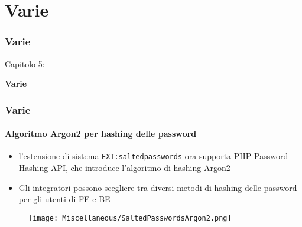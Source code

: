 %

\section{Varie}
\begin{frame}[fragile]
	\frametitle{Varie}

	\begin{center}\huge{Capitolo 5:}\end{center}
	\begin{center}\huge{\color{typo3darkgrey}\textbf{Varie}}\end{center}

\end{frame}


\begin{frame}[fragile]
	\frametitle{Varie}
	\framesubtitle{Algoritmo Argon2 per hashing delle password}

	\begin{itemize}
		\item l'estensione di sistema \texttt{EXT:saltedpasswords} ora supporta
			\href{https://secure.php.net/manual/en/ref.password.php}{PHP Password Hashing API},
			che introduce l'algoritmo di hashing Argon2
		\item Gli integratori possono scegliere tra diversi metodi di hashing delle password
			per gli utenti di FE e BE
	\end{itemize}

	\begin{figure}
		\texttt{[image: Miscellaneous/SaltedPasswordsArgon2.png]}
	\end{figure}


\end{frame}

